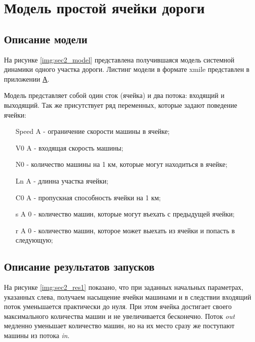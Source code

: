 \section{Модель простой ячейки дороги}

\subsection{Описание модели}

На рисунке \ref{img:sec2_model} представлена получившаяся модель системной динамики одного участка дороги. Листинг модели в формате xmile представлен в приложении \hyperlink{app-a}{А}.

Модель представляет собой один сток (ячейка) и два потока: входящий и выходящий.
Так же присутствует ряд переменных, которые задают поведение ячейки:
\begin{itemize}
    \item[Speed A] - ограничение скорости машины в ячейке;
    \item[V0 A] - входящая скорость машины;
    \item[N0] - количество машины на 1 км, которые могут находиться в ячейке;
    \item[Ln A] - длинна участка ячейки;
    \item[C0 A] - пропускная способность ячейки на 1 км;
    \item[s A 0] - количество машин, которые могут въехать с предыдущей ячейки;
    \item[r A 0] - количество машин, которое может выехать из ячейки и попасть в следующую;
\end{itemize}


\subsection{Описание результатов запусков}

На рисунке \ref{img:sec2_res1} показано, что при заданных начальных параметрах, указанных слева, получаем насыщение ячейки машинами и в следствии входящий поток уменьшается практически до нуля. При этом ячейка достигает своего максимального количества машин и не увеличивается бесконечно. Поток \textit{out} медленно уменьшает количество машин, но на их место сразу же поступают машины из потока \textit{in}.


